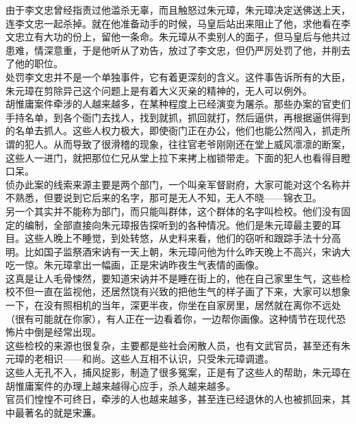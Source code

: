 \begin{multicols}{\theparacolNo}
由于李文忠曾经指责过他滥杀无辜，而且触怒过朱元璋，朱元璋决定送佛送上天，连李文忠一起杀掉。就在他准备动手的时候，马皇后站出来阻止了他，求他看在李文忠立有大功的份上，留他一条命。朱元璋从不卖别人的面子，但马皇后与他共过患难，情深意重，于是他听从了劝告，放过了李文忠，但仍严厉处罚了他，并削去了他的职位。\\

处罚李文忠并不是一个单独事件，它有着更深刻的含义。这件事告诉所有的大臣，朱元璋在剪除异己这个问题上是有着大义灭亲的精神的，无人可以例外。\\

胡惟庸案件牵涉的人越来越多，在某种程度上已经演变为屠杀。那些办案的官吏们手持名单，到各个衙门去找人，找到就抓，抓回就打，然后逼供，再根据逼供得到的名单去抓人。这些人权力极大，即使衙门正在办公，他们也能公然闯入，抓走所谓的犯人。从而导致了很滑稽的现象，往往官老爷刚刚还在堂上威风凛凛的断案，这些人一进门，就把那位仁兄从堂上拉下来拷上枷锁带走。下面的犯人也看得目瞪口呆。\\

侦办此案的线索来源主要是两个部门，一个叫亲军督尉府，大家可能对这个名称并不熟悉，但要说到它后来的名字，那可是无人不知，无人不晓——锦衣卫。\\

另一个其实并不能称为部门，而只能叫群体，这个群体的名字叫检校。他们没有固定的编制，全部直接向朱元璋报告探听到的各种情况。他们是朱元璋最主要的耳目。这些人晚上不睡觉，到处转悠，从史料来看，他们的窃听和跟踪手法十分高明。比如国子监祭酒宋讷有一天上朝，朱元璋问他为什么昨天晚上不高兴，宋讷大吃一惊。朱元璋拿出一幅画，正是宋讷昨夜生气表情的画像。\\

这真是让人毛骨悚然，要知道宋讷并不是睡在街上的，他在自己家里生气，这些检校不但一直在监视他，还居然饶有兴致的把他生气的样子画了下来，大家可以想象一下，在没有照相机的当年，深更半夜，你坐在自家房里，居然就在离你不远处（很有可能就在你家），有人正在一边看着你，一边帮你画像。这种情节在现代恐怖片中倒是经常出现。\\

这些检校的来源也很复杂，主要都是些社会闲散人员，也有文武官员，甚至还有朱元璋的老相识——和尚。这些人互相不认识，只受朱元璋调遣。\\

这些人无孔不入，捕风捉影，制造了很多冤案，正是有了这些人的帮助，朱元璋在胡惟庸案件的办理上越来越得心应手，杀人越来越多。\\

官员们惶惶不可终日，牵涉的人也越来越多，甚至连已经退休的人也被抓回来，其中最著名的就是宋濂。\\


\end{multicols}
